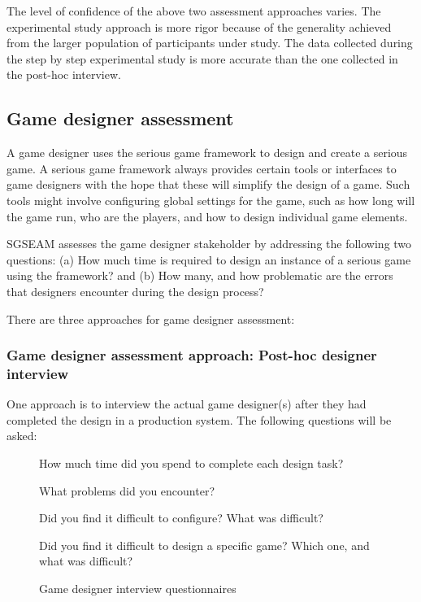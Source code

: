 \documentclass[11pt,oneside]{book}
\begin{document}
The level of confidence of the above two assessment approaches varies. The experimental study
approach is more rigor because of the generality achieved from the larger population of
participants under study. The data collected during the step by step experimental study is more
accurate than the one collected in the post-hoc interview.

\subsection{Game designer assessment}

A game designer uses the serious game framework to design and create a serious game.
A serious game framework always provides certain tools or interfaces to game designers
with the hope that these will simplify the design of a game. Such tools might involve
configuring global settings for the game, such as how long will the game run, who are the
players, and how to design individual game elements.

SGSEAM assesses the game designer stakeholder by addressing the following two questions: (a) How
much time is required to design an instance of a serious game using the framework? and (b) How
many, and how problematic are the errors that designers encounter during the design process?

There are three approaches for game designer assessment:

\subsubsection{Game designer assessment approach: Post-hoc designer interview}
\label{Post-hoc game designer interview}

One approach is to interview the actual game designer(s) after they had completed the design in a production system. The following questions will be asked:\\
 
\begin{figure}[ht!]
\begin{mybox}
\begin{compactenum}
\item How much time did you spend to complete each design task?
\item What problems did you encounter?
\item Did you find it difficult to configure? What was difficult?
\item Did you find it difficult to design a specific game? Which one, and what was difficult?\\
\end{compactenum}
\end{mybox}
\caption{Game designer interview questionnaires}
\label{fig:game-designer-interview}  
\end{figure}
\end{document}
